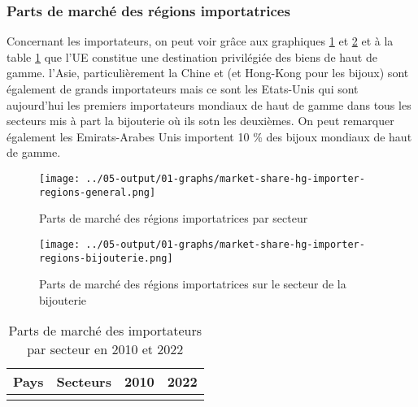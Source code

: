 \documentclass[french,10pt,a4paper]{article}
\begin{document}
\subsubsection{Parts de marché des régions importatrices}

Concernant les importateurs, on peut voir grâce aux graphiques \ref{fig:market-share-hg-importer-regions-general} et \ref{fig:market-share-hg-importer-regions-bijouterie} et à la table \ref{tab:market-share-country-importer} que l'UE constitue une destination privilégiée des biens de haut de gamme. l'Asie, particulièrement la Chine et (et Hong-Kong pour les bijoux) sont également de grands importateurs mais ce sont les Etats-Unis qui sont aujourd'hui les premiers importateurs mondiaux de haut de gamme dans tous les secteurs mis à part la bijouterie où ils sotn les deuxièmes. On peut remarquer également les Emirats-Arabes Unis importent 10 \% des bijoux mondiaux de haut de gamme. 

\begin{figure}[!h]
  \centering \texttt{[image: ../05-output/01-graphs/market-share-hg-importer-regions-general.png]}
  \caption{Parts de marché des régions importatrices par secteur}
  \label{fig:market-share-hg-importer-regions-general}
\end{figure}

\begin{figure}[!h]
  \centering \texttt{[image: ../05-output/01-graphs/market-share-hg-importer-regions-bijouterie.png]}
  \caption{Parts de marché des régions importatrices sur le secteur de la bijouterie}
  \label{fig:market-share-hg-importer-regions-bijouterie}
\end{figure}

\begin{table}[ht]
  \centering
  \begin{tabular}{lrrr}
    \hline
   Pays & Secteurs & 2010 & 2022 \\
    \hline
    \\
    \hline
  \end{tabular}
  \caption{Parts de marché des importateurs par secteur en 2010 et 2022}
  \label{tab:market-share-country-importer}
\end{table}
\end{document}
